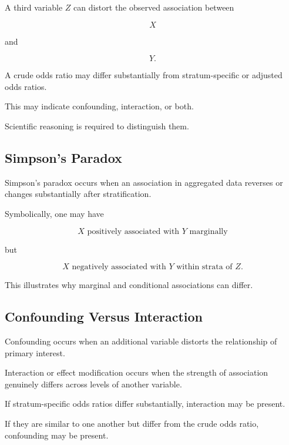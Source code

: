 A third variable \(Z\) can distort the observed association between

\[
X
\]

and

\[
Y.
\]

A crude odds ratio may differ substantially from stratum-specific or
adjusted odds ratios.

This may indicate confounding, interaction, or both.

Scientific reasoning is required to distinguish them.

\subsection{Simpson's Paradox}
\label{subsec:simpsons-paradox-categorical}

Simpson's paradox occurs when an association in aggregated data reverses
or changes substantially after stratification.

Symbolically, one may have

\[
\boxed{
X
\text{ positively associated with }Y
\text{ marginally}
}
\]

but

\[
\boxed{
X
\text{ negatively associated with }Y
\text{ within strata of }Z.
}
\]

This illustrates why marginal and conditional associations can differ.

\subsection{Confounding Versus Interaction}
\label{subsec:confounding-versus-interaction-categorical}

Confounding occurs when an additional variable distorts the relationship
of primary interest.

Interaction or effect modification occurs when the strength of
association genuinely differs across levels of another variable.

If stratum-specific odds ratios differ substantially, interaction may be
present.

If they are similar to one another but differ from the crude odds ratio,
confounding may be present.

